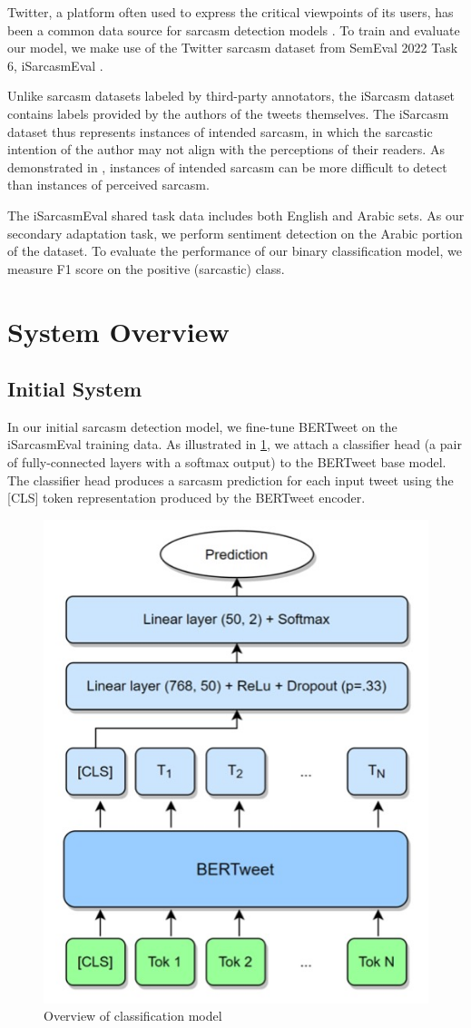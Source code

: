 \documentclass[11pt]{article}
\begin{document}
Twitter, a platform often used to express the critical viewpoints of its users, has been a common data source for sarcasm detection models \citealp{doi:10.1177/1470785320921779}. To train and evaluate our model, we make use of the Twitter sarcasm dataset from SemEval 2022 Task 6, iSarcasmEval \citealp{oprea-magdy-2020-isarcasm}. 

Unlike sarcasm datasets labeled by third-party annotators, the iSarcasm dataset contains labels provided by the authors of the tweets themselves. The iSarcasm dataset thus represents instances of intended sarcasm, in which the sarcastic intention of the author may not align with the perceptions of their readers. As demonstrated in \citealp{oprea-magdy-2020-isarcasm}, instances of intended sarcasm can be more difficult to detect than instances of perceived sarcasm. 

The iSarcasmEval shared task data includes both English and Arabic sets. As our secondary adaptation task, we perform sentiment detection on the Arabic portion of the dataset. To evaluate the performance of our binary classification model, we measure F1 score on the positive (sarcastic) class.

\section{System Overview}
\subsection{Initial System}

In our initial sarcasm detection model, we fine-tune BERTweet \citealp{nguyen-etal-2020-bertweet} on the iSarcasmEval training data. As illustrated in \ref{fig:overview-class-model}, we attach a classifier head (a pair of fully-connected layers with a softmax output) to the BERTweet base model. The classifier head produces a sarcasm prediction for each input tweet using the [CLS] token representation produced by the BERTweet encoder. 

\begin{figure}[h!]
    \includegraphics[width=.5\textwidth]{Picture1.jpg}
    \caption{Overview of classification model}
    \label{fig:overview-class-model}
\end{figure}
\end{document}
